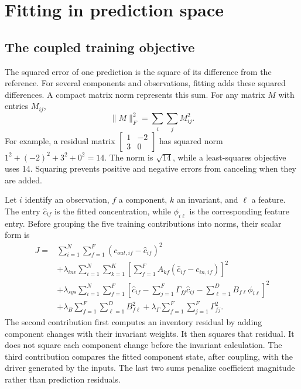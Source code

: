 \section{Fitting in prediction space}

\subsection{The coupled training objective}

The squared error of one prediction is the square of its difference from the reference. For several components and observations, fitting adds these squared differences. A compact matrix norm represents this sum. For any matrix \(M\) with entries \(M_{ij}\),
\begin{equation}
\label{eq:icsor_frobenius_definition}
\|M\|_F^2=\sum_i\sum_j M_{ij}^2.
\end{equation}
For example, a residual matrix \(\begin{bmatrix}1&-2\\3&0\end{bmatrix}\) has squared norm \(1^2+(-2)^2+3^2+0^2=14\). The norm is \(\sqrt{14}\), while a least-squares objective uses 14. Squaring prevents positive and negative errors from canceling when they are added.

Let \(i\) identify an observation, \(f\) a component, \(k\) an invariant, and \(\ell\) a feature. The entry \(\widehat c_{if}\) is the fitted concentration, while \(\phi_{i\ell}\) is the corresponding feature entry. Before grouping the five training contributions into norms, their scalar form is
\begin{equation}
\label{eq:icsor_training_scalar}
\begin{aligned}
J={}&\sum_{i=1}^{N}\sum_{f=1}^{F}
\left(c_{out,if}-\widehat c_{if}\right)^2\\
&+\lambda_{inv}\sum_{i=1}^{N}\sum_{k=1}^{K}
\left[\sum_{f=1}^{F}A_{kf}(\widehat c_{if}-c_{in,if})\right]^2\\
&+\lambda_{sys}\sum_{i=1}^{N}\sum_{f=1}^{F}
\left[\widehat c_{if}-\sum_{j=1}^{F}\Gamma_{fj}\widehat c_{ij}
-\sum_{\ell=1}^{D}B_{f\ell}\phi_{i\ell}\right]^2\\
&+\lambda_B\sum_{f=1}^{F}\sum_{\ell=1}^{D}B_{f\ell}^2
+\lambda_{\Gamma}\sum_{f=1}^{F}\sum_{j=1}^{F}\Gamma_{fj}^2.
\end{aligned}
\end{equation}
The second contribution first computes an inventory residual by adding component changes with their invariant weights. It then squares that residual. It does not square each component change before the invariant calculation. The third contribution compares the fitted component state, after coupling, with the driver generated by the inputs. The last two sums penalize coefficient magnitude rather than prediction residuals.

